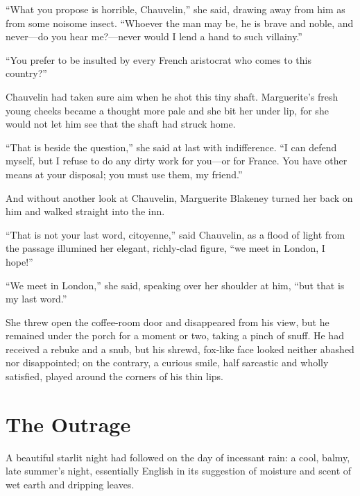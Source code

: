 \documentclass[paper=a5,BCOR=7mm,twoside,DIV=calc,12pt,usegeometry,chapterprefix,endperiod,headings=big]{scrbook}
\begin{document}
\enquote{What you propose is horrible, Chauvelin,} she said, drawing away from him as from some noisome insect. \enquote{Whoever the man may be, he is brave and noble, and never---do you hear me?---never would I lend a hand to such villainy.}

\enquote{You prefer to be insulted by every French aristocrat who comes to this country?}

Chauvelin had taken sure aim when he shot this tiny shaft. Marguerite's fresh young cheeks became a thought more pale and she bit her under lip, for she would not let him see that the shaft had struck home.

\enquote{That is beside the question,} she said at last with indifference. \enquote{I can defend myself, but I refuse to do any dirty work for you---or for France. You have other means at your disposal; you must use them, my friend.}

And without another look at Chauvelin, Marguerite Blakeney turned her back on him and walked straight into the inn.

\enquote{That is not your last word, citoyenne,} said Chauvelin, as a flood of light from the passage illumined her elegant, richly-clad figure, \enquote{we meet in London, I hope!}

\enquote{We meet in London,} she said, speaking over her shoulder at him, \enquote{but that is my last word.}

She threw open the coffee-room door and disappeared from his view, but he remained under the porch for a moment or two, taking a pinch of snuff. He had received a rebuke and a snub, but his shrewd, fox-like face looked neither abashed nor disappointed; on the contrary, a curious smile, half sarcastic and wholly satisfied, played around the corners of his thin lips.

\chapter{The Outrage}
\lettrine[lines=4]{A}{} beautiful starlit night had followed on the day of incessant rain: a cool, balmy, late summer's night, essentially English in its suggestion of moisture and scent of wet earth and dripping leaves.
\end{document}
